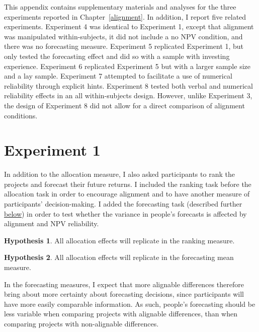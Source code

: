 \documentclass[a4paper, nobind, dvipsnames]{templates/ociamthesis}
\theoremstyle{definition}
\theoremstyle{definition}
\theoremstyle{definition}
\theoremstyle{definition}
\newtheorem{hypothesis}{Hypothesis}[chapter]
\theoremstyle{remark}
\begin{document}
\minitoc

This appendix contains supplementary materials and analyses for the three
experiments reported in Chapter~\ref{alignment}. In addition, I report five
related experiments. Experiment 4 was identical to Experiment 1, except that
alignment was manipulated within-subjects, it did not include a no NPV
condition, and there was no forecasting measure. Experiment 5 replicated
Experiment 1, but only tested the forecasting effect and did so with a sample
with investing experience. Experiment 6 replicated Experiment 5 but with a
larger sample size and a lay sample. Experiment 7 attempted to facilitate a use
of numerical reliability through explicit hints. Experiment 8 tested both verbal
and numerical reliability effects in an all within-subjects design. However,
unlike Experiment 3, the design of Experiment 8 did not allow for a direct
comparison of alignment conditions.

\hypertarget{alignment-2-appendix}{%
\section{Experiment 1}\label{alignment-2-appendix}}

In addition to the allocation measure, I also asked participants to rank the
projects and forecast their future returns. I included the ranking task before
the allocation task in order to encourage alignment and to have another measure
of participants' decision-making. I added the forecasting task (described
further \protect\hyperlink{forecasting-materials-alignment-2}{below}) in order to test whether
the variance in people's forecasts is affected by alignment and NPV reliability.

\begin{hypothesis}
\protect\hypertarget{hyp:ranking-all-alignment-2}{}{\label{hyp:ranking-all-alignment-2} }All allocation effects will replicate in the ranking measure.
\end{hypothesis}

\begin{hypothesis}
\protect\hypertarget{hyp:forecasting-mean-all-alignment-2}{}{\label{hyp:forecasting-mean-all-alignment-2} }All allocation effects will replicate in the forecasting mean measure.
\end{hypothesis}

In the forecasting measures, I expect that more alignable differences therefore
bring about more certainty about forecasting decisions, since participants will
have more easily comparable information. As such, people's forecasting should be
less variable when comparing projects with alignable differences, than when
comparing projects with non-alignable differences.
\end{document}
